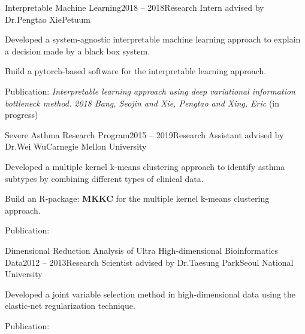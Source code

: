 \documentclass{tidycv} %
\begin{document}
\begin{cvresearches}
\begin{cvresearch}{Interpretable Machine Learning}{2018 -- 2018}{Research Intern advised by Dr.\@ Pengtao Xie}{Petuum}
 \item Developed a system-agnostic interpretable machine learning approach to explain a decision made by a black box system.
 \item Build a pytorch-based software for the interpretable learning approach.
 \item Publication: \textit{Interpretable learning approach using deep variational information bottleneck method. 2018 Bang, Seojin and Xie, Pengtao and Xing, Eric} (in progress)
\end{cvresearch}
\begin{cvresearch}{Severe Asthma Research Program}{2015 -- 2019}{Research Assistant advised by Dr.\@ Wei Wu}{Carnegie Mellon University}
 \item Developed a multiple kernel k-means clustering approach to identify asthma subtypes by combining different types of clinical data.
 \item Build an R-package: {\bf MKKC} for the multiple kernel k-means clustering approach.
 \item Publication: \cite{wu2018asthma, bang2016naive}
\end{cvresearch}
\begin{cvresearch}{Dimensional Reduction Analysis of Ultra High-dimensional Bioinformatics Data}{2012 -- 2013}{Research Scientist advised by Dr.\@ Taesung Park}{Seoul National University}
 \item Developed a joint variable selection method in high-dimensional data using the elastic-net regularization technique.
 \item Publication: \cite{bang2012joint}
\end{cvresearch}

\end{cvresearches}
\end{document}
